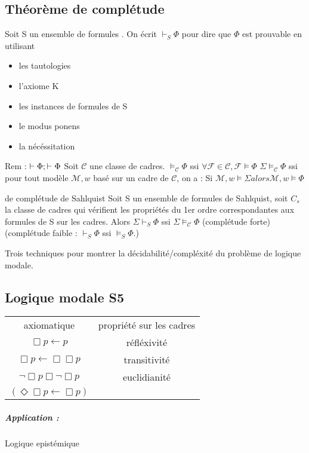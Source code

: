 \documentclass[a4paper,10pt]{article}
\newcommand{\F}{\mathcal{F}}
\begin{document}
\subsection{Théorème de complétude}

Soit S un ensemble de formules . On écrit $\vdash_S \Phi$ pour dire que $\Phi$ est prouvable en utilisant 
\begin{itemize}
 \item les tautologies
 \item l'axiome K
 \item les instances de formules de S
 \item le modus ponens
 \item la nécéssitation
\end{itemize}
Rem : $\vdash \Phi; \vdash_{\empty} \Phi$
Soit $\mathcal{C}$ une classe de cadres.
$\models_{\mathcal{C}} \Phi$ ssi $\forall \F \in \mathcal{C}, \F \models \Phi$
$\Sigma \models_{\mathcal{C}} \Phi$ ssi pour tout modèle $\mathcal{M}, w$ basé sur un cadre de $\mathcal{C}$, on a :
Si $\mathcal{M}, w \models \Sigma alors \mathcal{M}, w \models \Phi$

\begin{thm}{de complétude de Sahlquist}
Soit S un ensemble de formules de Sahlquist, soit $C_s$ la classe de cadres qui vérifient les propriétés du 1er ordre correspondantes aux formules de S sur les cadres.
Alors  $\Sigma \vdash_S \Phi$ ssi $\Sigma \models_{\mathcal{C}} \Phi$ (complétude forte)
(complétude faible : $\vdash_S \Phi$ ssi $\models_S \Phi$.)
\end{thm}

Trois techniques pour montrer la décidabilité/compléxité du problème de logique modale.

\subsection{Logique modale S5}
\begin{tabular}{c | c  }
 axiomatique & propriété sur les cadres \\
 $\Box p \leftarrow p$ & réfléxivité\\
 $\Box p \leftarrow \Box \Box p$ & transitivité\\
 $\lnot\Box p \Box \lnot \Box p$ & euclidianité\\
 $(\Diamond \Box p \leftarrow \Box p)$\\
\end{tabular}
\subparagraph{Application : } Logique epistémique
\end{document}
